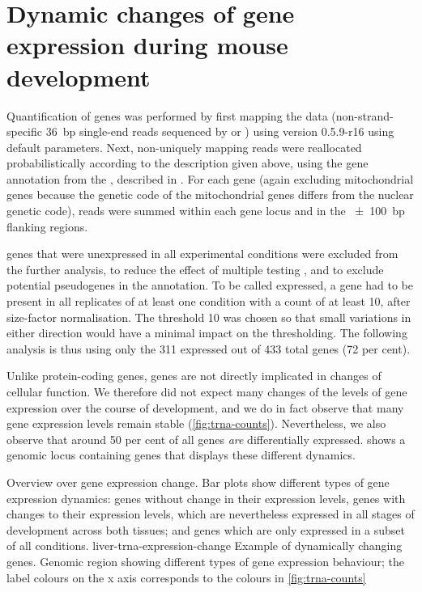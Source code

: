 \section{Dynamic changes of  gene expression during mouse
development}

Quantification of \trna genes was performed by first mapping the  \chipseq
data (non-strand-specific \SI{36}{bp} single-end reads sequenced by
  or ) using
 version 0.5.9-r16 \citep{Li:2009a} using default parameters.
Next, non-uniquely mapping reads were reallocated probabilistically according to
the description given above, using the \trna gene annotation from the
, described in \citet{Chan:2009}. For each \trna
gene (again excluding mitochondrial \trna genes because the genetic code of the
mitochondrial \mrna genes differs from the nuclear genetic code), reads were
summed within each \trna gene locus and in the \SI{\pm100}{bp} flanking regions.

\trna genes that were unexpressed in all experimental conditions were excluded
from the further analysis, to reduce the effect of multiple testing
\citep{Bourgon:2010}, and to exclude potential pseudogenes in the annotation. To
be called expressed, a \trna gene had to be present in all replicates of at
least one condition with a count of at least \num{10}, after size-factor
normalisation. The threshold \num{10} was chosen so that small variations in
either direction would have a minimal impact on the thresholding. The following
analysis is thus using only the \num{311} expressed out of \num{433} total genes
(\num{72} per cent).

Unlike protein-coding genes, \trna genes are not directly implicated in changes
of cellular function. We therefore did not expect many changes of the levels of
\trna gene expression over the course of development, and we do in fact observe
that many \trna gene expression levels remain stable (\cref{fig:trna-counts}).
Nevertheless, we also observe that around \num{50} per cent of all \trna genes
\emph{are} differentially expressed. 
shows a genomic locus containing \trna genes that displays these different
dynamics.

    {Overview over \trna gene expression change.}
    {Bar plots show different types of \trna gene expression dynamics: \trna
    genes without change in their expression levels, \trna genes with changes to
    their expression levels, which are nevertheless expressed in all stages of
    development across both tissues; and \trna genes which are only expressed in
    a subset of all conditions.}
    {liver-trna-expression-change}
    {Example of dynamically changing \trna genes.}
    {Genomic region showing different types of \trna gene expression behaviour;
    the label colours on the x axis corresponds to the colours in
    \cref{fig:trna-counts}}

